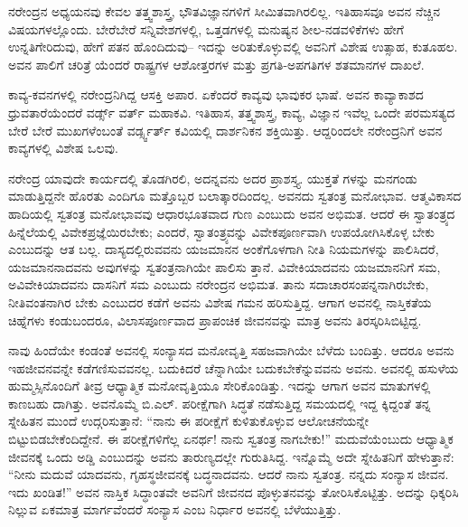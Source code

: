 ನರೇಂದ್ರನ ಅಧ್ಯಯನವು ಕೇವಲ ತತ್ತ್ವಶಾಸ್ತ್ರ, ಭೌತವಿಜ್ಞಾನಗಳಿಗೆ ಸೀಮಿತವಾಗಿರಲಿಲ್ಲ. ಇತಿಹಾಸವೂ ಅವನ ನೆಚ್ಚಿನ ವಿಷಯಗಳಲ್ಲೊಂದು. ಬೇರೆಬೇರೆ ಸನ್ನಿವೇಶಗಳಲ್ಲಿ, ಒತ್ತಡಗಳಲ್ಲಿ ಮನುಷ್ಯನ ಶೀಲ-ನಡವಳಿಕೆಗಳು ಹೇಗೆ ಉನ್ನತಿಗೇರಿದುವು, ಹೇಗೆ ಪತನ ಹೊಂದಿದುವು– ಇದನ್ನು ಅರಿತುಕೊಳ್ಳುವಲ್ಲಿ ಅವನಿಗೆ ವಿಶೇಷ ಉತ್ಸಾಹ, ಕುತೂಹಲ. ಅವನ ಪಾಲಿಗೆ ಚರಿತ್ರೆ ಯೆಂದರೆ ರಾಷ್ಟ್ರಗಳ ಆಶೋತ್ತರಗಳ ಮತ್ತು ಪ್ರಗತಿ-ಅಪಗತಿಗಳ ಶತಮಾನಗಳ ದಾಖಲೆ.

ಕಾವ್ಯ-ಕವನಗಳಲ್ಲಿ ನರೇಂದ್ರನಿಗಿದ್ದ ಆಸಕ್ತಿ ಅಪಾರ. ಏಕೆಂದರೆ ಕಾವ್ಯವು ಭಾವುಕರ ಭಾಷೆ. ಅವನ ಕಾವ್ಯಾಕಾಶದ ಧ್ರುವತಾರೆಯೆಂದರೆ ವರ್ಡ್ಸ್ ವರ್ತ್ ಮಹಾಕವಿ. ಇತಿಹಾಸ, ತತ್ತ್ವಶಾಸ್ತ್ರ, ಕಾವ್ಯ, ವಿಜ್ಞಾನ ಇವೆಲ್ಲ ಒಂದೇ ಪರಮಸತ್ಯದ ಬೇರೆ ಬೇರೆ ಮುಖಗಳೆಂಬಂತೆ ವರ್ಡ್ಸ್ವರ್ತ್ ಕವಿಯಲ್ಲಿ ದಾರ್ಶನಿಕನ ಶಕ್ತಿಯಿತ್ತು. ಆದ್ದರಿಂದಲೇ ನರೇಂದ್ರನಿಗೆ ಅವನ ಕಾವ್ಯಗಳಲ್ಲಿ ವಿಶೇಷ ಒಲವು.

ನರೇಂದ್ರ ಯಾವುದೇ ಕಾರ್ಯದಲ್ಲಿ ತೊಡಗಿರಲಿ, ಅದನ್ನವನು ಅದರ ಪ್ರಾಶಸ್ತ್ಯ. ಯುಕ್ತತೆ ಗಳನ್ನು ಮನಗಂಡು ಮಾಡುತ್ತಿದ್ದನೇ ಹೊರತು ಎಂದಿಗೂ ಮತ್ತೊಬ್ಬರ ಬಲಾತ್ಕಾರದಿಂದಲ್ಲ. ಅವನದು ಸ್ವತಂತ್ರ ಮನೋಭಾವ. ಆತ್ಮವಿಕಾಸದ ಹಾದಿಯಲ್ಲಿ ಸ್ವತಂತ್ರ ಮನೋಭಾವವು ಆಧಾರಭೂತವಾದ ಗುಣ ಎಂಬುದು ಅವನ ಅಭಿಮತ. ಆದರೆ ಈ ಸ್ವಾತಂತ್ರ್ಯದ ಹಿನ್ನೆಲೆಯಲ್ಲಿ ವಿವೇಕಪ್ರಜ್ಞೆಯಿರಬೇಕು; ಎಂದರೆ, ಸ್ವಾತಂತ್ರ್ಯವನ್ನು ವಿವೇಕಪೂರ್ಣವಾಗಿ ಉಪಯೋಗಿಸಿಕೊಳ್ಳ ಬೇಕು ಎಂಬುದನ್ನು ಆತ ಬಲ್ಲ. ದಾಸ್ಯದಲ್ಲಿರುವವನು ಯಜಮಾನನ ಅಂಕೆಗೊಳಗಾಗಿ ನೀತಿ ನಿಯಮಗಳನ್ನು ಪಾಲಿಸಿದರೆ, ಯಜಮಾನನಾದವನು ಅವುಗಳನ್ನು ಸ್ವತಂತ್ರನಾಗಿಯೇ ಪಾಲಿಸು ತ್ತಾನೆ. ವಿವೇಕಿಯಾದವನು ಯಜಮಾನನಿಗೆ ಸಮ, ಅವಿವೇಕಿಯಾದವನು ದಾಸನಿಗೆ ಸಮ ಎಂಬುದು ನರೇಂದ್ರನ ಅಭಿಮತ. ತಾನು ಸದಾಚಾರಸಂಪನ್ನನಾಗಿರಬೇಕು, ನೀತಿವಂತನಾಗಿರ ಬೇಕು ಎಂಬುದರ ಕಡೆಗೆ ಅವನು ವಿಶೇಷ ಗಮನ ಹರಿಸುತ್ತಿದ್ದ. ಆಗಾಗ ಅವನಲ್ಲಿ ನಾಸ್ತಿಕತೆಯ ಚಿಹ್ನೆಗಳು ಕಂಡುಬಂದರೂ, ವಿಲಾಸಪೂರ್ಣವಾದ ಪ್ರಾಪಂಚಿಕ ಜೀವನವನ್ನು ಮಾತ್ರ ಅವನು ತಿರಸ್ಕರಿಸಿಬಿಟ್ಟಿದ್ದ.

ನಾವು ಹಿಂದೆಯೇ ಕಂಡಂತೆ ಅವನಲ್ಲಿ ಸಂನ್ಯಾಸದ ಮನೋವೃತ್ತಿ ಸಹಜವಾಗಿಯೇ ಬೆಳೆದು ಬಂದಿತ್ತು. ಆದರೂ ಅವನು ಇಹಜೀವನವನ್ನೇ ಕಡೆಗಣಿಸುವವನಲ್ಲ. ಬದುಕಿದರೆ ಚೆನ್ನಾಗಿಯೇ ಬದುಕಬೇಕೆನ್ನುವವನು ಅವನು. ಅವನಲ್ಲಿ ಹಸುಳೆಯ ಹುಮ್ಮಸ್ಸಿನೊಂದಿಗೆ ತೀವ್ರ ಆಧ್ಯಾತ್ಮಿಕ ಮನೋವೃತ್ತಿಯೂ ಸೇರಿಕೊಂಡಿತ್ತು. ಇದನ್ನು ಆಗಾಗ ಅವನ ಮಾತುಗಳಲ್ಲಿ ಕಾಣಬಹು ದಾಗಿತ್ತು. ಅವನೊಮ್ಮೆ ಬಿ.ಎಲ್. ಪರೀಕ್ಷೆಗಾಗಿ ಸಿದ್ಧತೆ ನಡೆಸುತ್ತಿದ್ದ ಸಮಯದಲ್ಲಿ ಇದ್ದ ಕ್ಕಿದ್ದಂತೆ ತನ್ನ ಸ್ನೇಹಿತನ ಮುಂದೆ ಉದ್ಗರಿಸುತ್ತಾನೆ: “ನಾನು ಈ ಪರೀಕ್ಷೆಗೆ ಕುಳಿತುಕೊಳ್ಳುವ ಆಲೋಚನೆಯನ್ನೇ ಬಿಟ್ಟುಬಿಡಬೇಕೆಂದಿದ್ದೇನೆ. ಈ ಪರೀಕ್ಷೆಗಳಿಗೆಲ್ಲ ಏನರ್ಥ! ನಾನು ಸ್ವತಂತ್ರ ನಾಗಬೇಕು!” ಮದುವೆಯೆಂಬುದು ಆಧ್ಯಾತ್ಮಿಕ ಜೀವನಕ್ಕೆ ಒಂದು ಅಡ್ಡಿ ಎಂಬುದನ್ನು ಅವನು ತಾರುಣ್ಯದಲ್ಲೇ ಗುರುತಿಸಿದ್ದ. ಇನ್ನೊಮ್ಮೆ ಅದೇ ಸ್ನೇಹಿತನಿಗೆ ಹೇಳುತ್ತಾನೆ: “ನೀನು ಮದುವೆ ಯಾದವನು, ಗೃಹಸ್ಥಜೀವನಕ್ಕೆ ಬದ್ಧನಾದವನು. ಆದರೆ ನಾನು ಸ್ವತಂತ್ರ. ನನ್ನದು ಸಂನ್ಯಾಸ ಜೀವನ. ಇದು ಖಂಡಿತ!” ಅವನ ನಾಸ್ತಿಕ ಸಿದ್ಧಾಂತವೇ ಅವನಿಗೆ ಜೀವನದ ಪೊಳ್ಳುತನವನ್ನು ತೋರಿಸಿಕೊಟ್ಟಿತ್ತು. ಅದನ್ನು ಧಿಕ್ಕರಿಸಿ ನಿಲ್ಲುವ ಏಕಮಾತ್ರ ಮಾರ್ಗವೆಂದರೆ ಸಂನ್ಯಾಸ ಎಂಬ ನಿರ್ಧಾರ ಅವನಲ್ಲಿ ಬೆಳೆಯುತ್ತಿತ್ತು.

